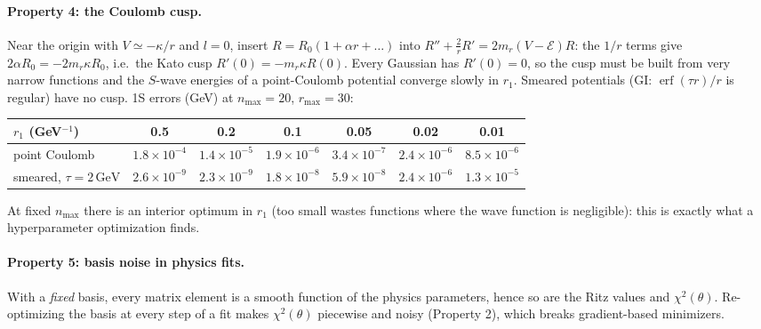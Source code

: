 \documentclass[11pt,a4paper]{article}
\numberwithin{equation}{section}
\theoremstyle{definition}
\theoremstyle{plain}
\theoremstyle{remark}
\numberwithin{algorithm}{section}
\newcommand{\erf}{\operatorname{erf}}
\newcommand{\mr}{m_r}
\newcommand{\GeV}{\,\mathrm{GeV}}
\begin{document}
\paragraph{Property 4: the Coulomb cusp.} Near the origin with $V\simeq-\kappa/r$ and $l=0$, insert $R=R_0(1+\alpha r+\dots)$ into $R''+\frac2rR'=2\mr(V-\mathcal E)R$: the $1/r$ terms give $2\alpha R_0=-2\mr\kappa R_0$, i.e.\ the Kato cusp $R'(0)=-\mr\kappa R(0)$. Every Gaussian has $R'(0)=0$, so the cusp must be built from very narrow functions and the $S$-wave energies of a point-Coulomb potential converge slowly in $r_1$. Smeared potentials (GI: $\erf(\tau r)/r$ is regular) have no cusp. 1S errors (GeV) at $n_{\max}=20$, $r_{\max}=30$:
\begin{center}\small
\begin{tabular}{@{}lcccccc@{}}\toprule
$r_1$ (GeV$^{-1}$) & 0.5 & 0.2 & 0.1 & 0.05 & 0.02 & 0.01\\\midrule
point Coulomb & $1.8\times10^{-4}$ & $1.4\times10^{-5}$ & $1.9\times10^{-6}$ & $3.4\times10^{-7}$ & $2.4\times10^{-6}$ & $8.5\times10^{-6}$\\
smeared, $\tau=2\GeV$ & $2.6\times10^{-9}$ & $2.3\times10^{-9}$ & $1.8\times10^{-8}$ & $5.9\times10^{-8}$ & $2.4\times10^{-6}$ & $1.3\times10^{-5}$\\\bottomrule
\end{tabular}
\end{center}
At fixed $n_{\max}$ there is an interior optimum in $r_1$ (too small wastes functions where the wave function is negligible): this is exactly what a hyperparameter optimization finds.

\paragraph{Property 5: basis noise in physics fits.} With a \emph{fixed} basis, every matrix element is a smooth function of the physics parameters, hence so are the Ritz values and $\chi^2(\theta)$. Re-optimizing the basis at every step of a fit makes $\chi^2(\theta)$ piecewise and noisy (Property 2), which breaks gradient-based minimizers.
\end{document}
